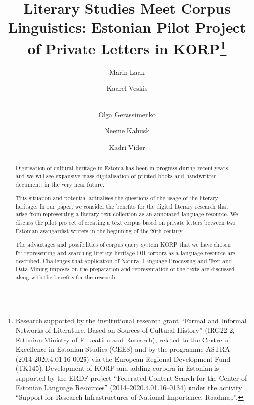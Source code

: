 \documentclass[runningheads]{llncs}
\begin{document}
%
\title{Literary Studies Meet Corpus Linguistics: Estonian Pilot Project of Private Letters in KORP\thanks{Research supported by the institutional research grant ``Formal and Informal Networks of Literature, Based on Sources of Cultural History'' (IRG22-2, Estonian Ministry of Education and Research), related to the Centre of Excellence in Estonian Studies (CEES) and by the programme ASTRA (2014-2020.4.01.16-0026) via the European Regional Development Fund (TK145).  Development of KORP and adding corpora in Estonian is supported by the ERDF project ``Federated Content Search for the Center of Estonian Language Resources'' (2014--2020.4.01.16--0134) under the activity ``Support for Research Infrastructures of National Importance, Roadmap''.  }}
%
%
\author{Marin Laak \and Kaarel Veskis \and\\
Olga Gerassimenko \and Neeme Kahusk \and
Kadri Vider}
%
%
%
\maketitle              %
%
\begin{abstract}
  Digitisation of cultural heritage in Estonia has been in progress during recent years, and we will see expansive mass digitalisation of printed books and handwritten documents in the very near future.
  
  This situation and potential actualises the questions of the usage of the literary heritage. In our paper, we consider the benefits for the digital literary research that arise from representing a literary text collection as an annotated language resource. We discuss the pilot project of creating a text corpus based on private letters between two Estonian avangardist writers in the beginning of the 20th century.
  
The advantages and possibilities of corpus query system KORP that we have chosen for representing and searching literary heritage DH corpora as a language resource are described. Challenges that application of Natural Language Processing and Text and Data Mining imposes on the preparation and representation of the texts are discussed along with the benefits for the research. 



\end{abstract}
%
%
%
\end{document}
